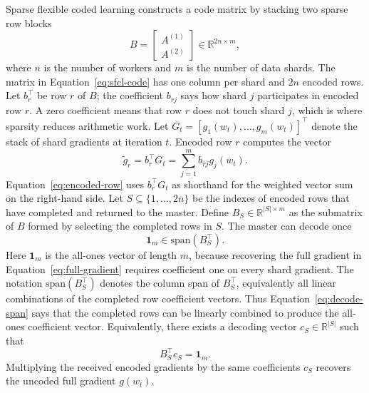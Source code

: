 Sparse flexible coded learning constructs a code matrix by stacking two sparse
row blocks
\begin{equation}
  \label{eq:sfcl-code}
  B =
  \begin{bmatrix}
    A^{(1)} \\
    A^{(2)}
\end{bmatrix}
  \in \mathbb{R}^{2n \times m},
\end{equation}
where $n$ is the number of workers and $m$ is the number of data shards.  The
matrix in Equation~\eqref{eq:sfcl-code} has one column per shard and $2n$
encoded rows.  Let $b_r^\top$ be row $r$ of $B$; the coefficient $b_{rj}$ says
how shard $j$ participates in encoded row $r$.  A zero coefficient means that
row $r$ does not touch shard $j$, which is where sparsity reduces arithmetic
work.  Let
$G_t=[g_1(w_t),\ldots,g_m(w_t)]^\top$ denote the stack of shard gradients at
iteration $t$.  Encoded row $r$ computes the vector
\begin{equation}
  \label{eq:encoded-row}
  \tilde{g}_r = b_r^\top G_t = \sum_{j=1}^{m} b_{rj} g_j(w_t).
\end{equation}
Equation~\eqref{eq:encoded-row} uses $b_r^\top G_t$ as shorthand for the
weighted vector sum on the right-hand side.  Let
$S \subseteq \{1,\ldots,2n\}$ be the indexes of encoded rows that have
completed and returned to the master.  Define
$B_S \in \mathbb{R}^{|S|\times m}$ as the submatrix of $B$ formed by selecting
the completed rows in $S$.  The master can decode once
\begin{equation}
  \label{eq:decode-span}
  \mathbf{1}_m \in \mathrm{span}(B_S^\top).
\end{equation}
Here $\mathbf{1}_m$ is the all-ones vector of length $m$, because recovering the
full gradient in Equation~\eqref{eq:full-gradient} requires coefficient one on
every shard gradient.
The notation $\mathrm{span}(B_S^\top)$ denotes the column span of
$B_S^\top$, equivalently all linear combinations of the completed row
coefficient vectors.  Thus Equation~\eqref{eq:decode-span} says that the
completed rows can be linearly combined to produce the all-ones coefficient
vector.  Equivalently, there exists a decoding vector
$c_S \in \mathbb{R}^{|S|}$ such that
\begin{equation}
  \label{eq:decode-vector}
  B_S^\top c_S = \mathbf{1}_m.
\end{equation}
Multiplying the received encoded gradients by the same coefficients $c_S$
recovers the uncoded full gradient $g(w_t)$.

